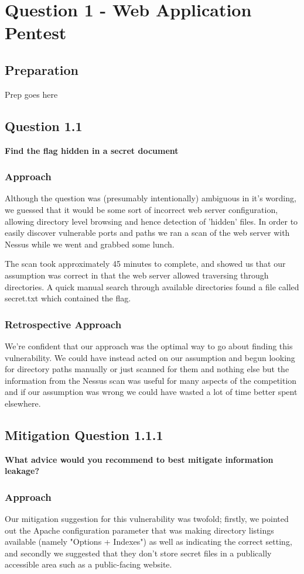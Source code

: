 \chapter{Question 1 - Web Application Pentest}

\section{Preparation}
Prep goes here

\section{Question 1.1}
\textbf{Find the flag hidden in a secret document}
\subsection{Approach}
Although the question was (presumably intentionally) ambiguous in it's wording,
we guessed that it would be some sort of incorrect web server configuration,
allowing directory level browsing and hence detection of 'hidden' files. In
order to easily discover vulnerable ports and paths we ran a scan of the web
server with Nessus while we went and grabbed some lunch.

The scan took approximately 45 minutes to complete, and showed us that our
assumption was correct in that the web server allowed traversing through
directories. A quick manual search through available directories found a file
called secret.txt which contained the flag.
\subsection{Retrospective Approach}
We're confident that our approach was the optimal way to go about finding this
vulnerability. We could have instead acted on our assumption and begun looking
for directory paths manually or just scanned for them and nothing else but the
information from the Nessus scan was useful for many aspects of the competition
and if our assumption was wrong we could have wasted a lot of time better spent
elsewhere.

\section{Mitigation Question 1.1.1}
\textbf{What advice would you recommend to best mitigate information leakage?}
\subsection{Approach}
Our mitigation suggestion for this vulnerability was twofold; firstly, we pointed
out the Apache configuration parameter that was making directory listings
available (namely "Options + Indexes") as well as indicating the correct
setting, and secondly we suggested that they don't store secret files in a
publically accessible area such as a public-facing website.

